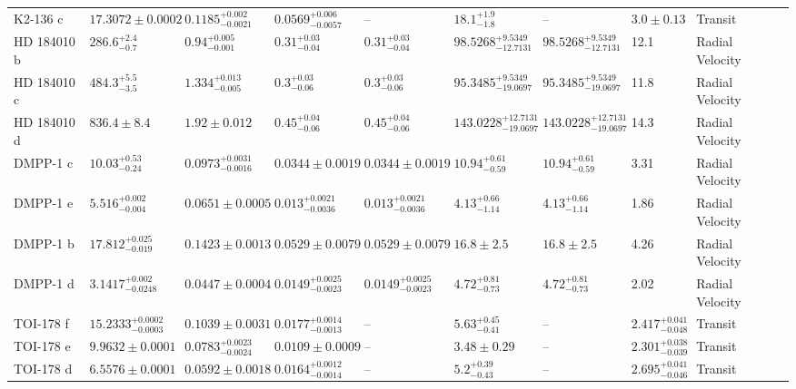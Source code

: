\begin{tabular}{llllllllll}
K2-136 c & $17.3072 \pm 0.0002$ & $0.1185^{+0.002}_{-0.0021}$ & $0.0569^{+0.006}_{-0.0057}$ & -- & $18.1^{+1.9}_{-1.8}$ & -- & $3.0 \pm 0.13$ & Transit & \cite{MAYO_ET_AL_2023} \\
HD 184010 b & $286.6^{+2.4}_{-0.7}$ & $0.94^{+0.005}_{-0.001}$ & $0.31^{+0.03}_{-0.04}$ & $0.31^{+0.03}_{-0.04}$ & $98.5268^{+9.5349}_{-12.7131}$ & $98.5268^{+9.5349}_{-12.7131}$ & 12.1 & Radial Velocity & \cite{TENG_ET_AL_2022} \\
HD 184010 c & $484.3^{+5.5}_{-3.5}$ & $1.334^{+0.013}_{-0.005}$ & $0.3^{+0.03}_{-0.06}$ & $0.3^{+0.03}_{-0.06}$ & $95.3485^{+9.5349}_{-19.0697}$ & $95.3485^{+9.5349}_{-19.0697}$ & 11.8 & Radial Velocity & \cite{TENG_ET_AL_2022} \\
HD 184010 d & $836.4 \pm 8.4$ & $1.92 \pm 0.012$ & $0.45^{+0.04}_{-0.06}$ & $0.45^{+0.04}_{-0.06}$ & $143.0228^{+12.7131}_{-19.0697}$ & $143.0228^{+12.7131}_{-19.0697}$ & 14.3 & Radial Velocity & \cite{TENG_ET_AL_2022} \\
DMPP-1 c & $10.03^{+0.53}_{-0.24}$ & $0.0973^{+0.0031}_{-0.0016}$ & $0.0344 \pm 0.0019$ & $0.0344 \pm 0.0019$ & $10.94^{+0.61}_{-0.59}$ & $10.94^{+0.61}_{-0.59}$ & 3.31 & Radial Velocity & \cite{STANDING_ET_AL_2026} \\
DMPP-1 e & $5.516^{+0.002}_{-0.004}$ & $0.0651 \pm 0.0005$ & $0.013^{+0.0021}_{-0.0036}$ & $0.013^{+0.0021}_{-0.0036}$ & $4.13^{+0.66}_{-1.14}$ & $4.13^{+0.66}_{-1.14}$ & 1.86 & Radial Velocity & \cite{STAAB_ET_AL__2020} \\
DMPP-1 b & $17.812^{+0.025}_{-0.019}$ & $0.1423 \pm 0.0013$ & $0.0529 \pm 0.0079$ & $0.0529 \pm 0.0079$ & $16.8 \pm 2.5$ & $16.8 \pm 2.5$ & 4.26 & Radial Velocity & \cite{STANDING_ET_AL_2026} \\
DMPP-1 d & $3.1417^{+0.002}_{-0.0248}$ & $0.0447 \pm 0.0004$ & $0.0149^{+0.0025}_{-0.0023}$ & $0.0149^{+0.0025}_{-0.0023}$ & $4.72^{+0.81}_{-0.73}$ & $4.72^{+0.81}_{-0.73}$ & 2.02 & Radial Velocity & \cite{STANDING_ET_AL_2026} \\
TOI-178 f & $15.2333^{+0.0002}_{-0.0003}$ & $0.1039 \pm 0.0031$ & $0.0177^{+0.0014}_{-0.0013}$ & -- & $5.63^{+0.45}_{-0.41}$ & -- & $2.417^{+0.041}_{-0.048}$ & Transit & \cite{LELEU_ET_AL__2024} \\
TOI-178 e & $9.9632 \pm 0.0001$ & $0.0783^{+0.0023}_{-0.0024}$ & $0.0109 \pm 0.0009$ & -- & $3.48 \pm 0.29$ & -- & $2.301^{+0.038}_{-0.039}$ & Transit & \cite{LELEU_ET_AL__2024} \\
TOI-178 d & $6.5576 \pm 0.0001$ & $0.0592 \pm 0.0018$ & $0.0164^{+0.0012}_{-0.0014}$ & -- & $5.2^{+0.39}_{-0.43}$ & -- & $2.695^{+0.041}_{-0.046}$ & Transit & \cite{LELEU_ET_AL__2024} \\

\end{tabular}
